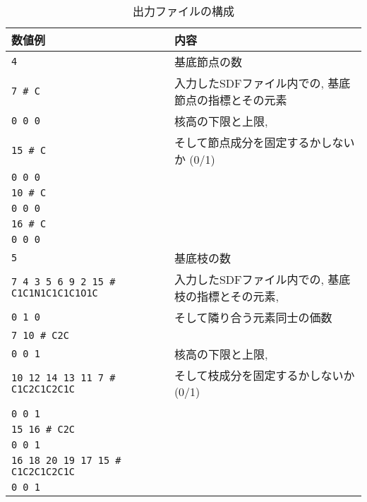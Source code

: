 \documentclass[11pt,titlepage,dvipdfmx,twoside]{jarticle}
\begin{document}
\bigskip
\begin{table}[H]
\begin{center} \caption{出力ファイルの構成}
\label{tab:PartitionFormat}
  \begin{tabular}{l|l}
  数値例 & 内容\\ \hline \hline
{\tt  4} & 基底節点の数\\ \hline
{\tt  7 \# C} & 入力したSDFファイル内での, 基底節点の指標とその元素\\
{\tt  0 0 0} & 核高の下限と上限, \\
{\tt  15 \# C} & \hspace{10mm}そして節点成分を固定するかしないか (0/1)\\
{\tt  0 0 0} & \\
{\tt  10 \# C} & \\
{\tt  0 0 0} & \\ 
{\tt  16 \# C} &\\ 
{\tt  0 0 0} & \\ \hline
{\tt  5} & 基底枝の数　\\ \hline
{\tt  7 4 3 5 6 9 2 15 \# C1C1N1C1C1C1O1C} & 入力したSDFファイル内での, 基底枝の指標とその元素,\\
{\tt  0 1 0} & \hspace{10mm}そして隣り合う元素同士の価数　\\
{\tt  7 10 \# C2C} &\\ 
{\tt  0 0 1} & 核高の下限と上限,\\
{\tt  10 12 14 13 11 7 \# C1C2C1C2C1C} & \hspace{10mm}そして枝成分を固定するかしないか (0/1)\\\\
{\tt  0 0 1} & \\
{\tt  15 16 \# C2C} & \\
{\tt  0 0 1} & \\
{\tt  16 18 20 19 17 15 \# C1C2C1C2C1C} & \\
{\tt  0 0 1} & \\ \hline
  \end{tabular}
\end{center}
\end{table}


\end{document}
